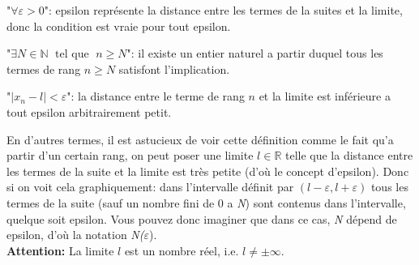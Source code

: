 \documentclass[a4paper, 12pt, french, twoside]{article}
\newcommand{\Nn}{{\mathbb{N}}}
\newcommand{\Rr}{{\mathbb{R}}}
\begin{document}
"$\forall \varepsilon>0$": epsilon représente la distance entre les termes de la suites et la limite, donc la condition est vraie pour tout epsilon.

"$\exists N\in\Nn \; \text{ tel que } \; n\geq N$": il existe un entier naturel a partir duquel tous les termes de rang $n\geq N$ satisfont l'implication.

"$|x_n-l|<\varepsilon$": la distance entre le terme de rang $n$ et la limite est inférieure a tout epsilon arbitrairement petit.

En d'autres termes, il est astucieux de voir cette définition comme le fait qu'a partir d'un certain rang, on peut poser une limite $l\in\Rr$ telle que la distance entre les termes de la suite et la limite est très petite (d'où le concept d'epsilon).
Donc si on voit cela graphiquement: dans l'intervalle définit par $(l-\varepsilon,l+\varepsilon)$ tous les termes de la suite (sauf un nombre fini de 0 a \textit{N}) sont contenus dans l'intervalle, quelque soit epsilon.
Vous pouvez donc imaginer que dans ce cas, \textit{N} dépend de epsilon, d'où la notation \textit{N(}$\varepsilon$).
\\\textbf{Attention: } La limite $l$ est un nombre réel, i.e. $l\neq\pm\infty$. 
\end{document}
